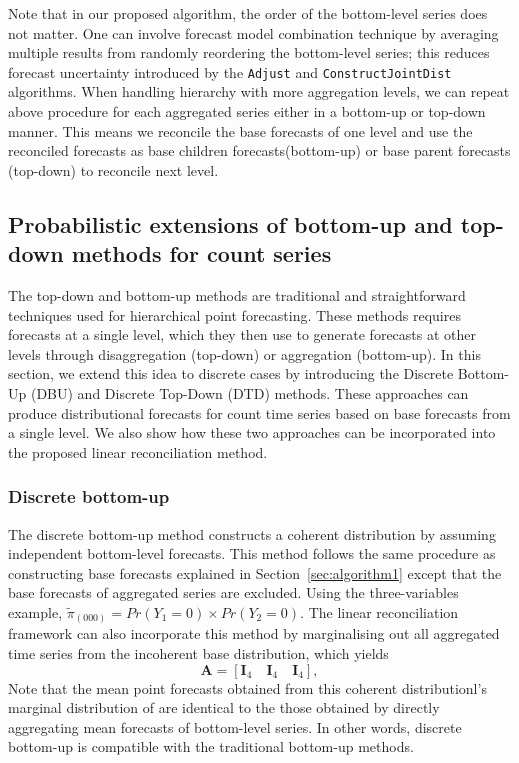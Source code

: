 \documentclass[a4paper,review,12pt,authoryear]{elsarticle}
\let\code=\texttt
\begin{document}
  Note that in our proposed algorithm, the order of the bottom-level series does not matter.
  One can involve forecast model combination technique by averaging multiple results from randomly reordering the bottom-level series; this reduces forecast uncertainty introduced by the \code{Adjust} and \code{ConstructJointDist} algorithms.
  When handling hierarchy with more aggregation levels, we can repeat above procedure for each aggregated series either in a bottom-up or top-down manner. This means we reconcile the base forecasts of one level and use the reconciled forecasts as base children forecasts(bottom-up) or base parent forecasts (top-down) to reconcile next level.

  

    \subsection{Probabilistic extensions of bottom-up and top-down methods for count series}

    The top-down and bottom-up methods are traditional and straightforward techniques used for hierarchical point forecasting. 
    These methods requires forecasts at a single level, which they then use to generate forecasts at other levels through disaggregation (top-down) or aggregation (bottom-up).
    In this section, we extend this idea to discrete cases by introducing the Discrete Bottom-Up (DBU) and Discrete Top-Down (DTD) methods. These approaches can produce distributional forecasts for count time series based on base forecasts from a single level.
    We also show how these two approaches can be incorporated into the proposed linear reconciliation method.

    \subsubsection*{\textbf{Discrete bottom-up}}
    \label{sec:bottomup}

    The discrete bottom-up method constructs a coherent distribution by assuming independent bottom-level forecasts.
    This method follows the same procedure as constructing base forecasts explained in Section~\ref{sec:algorithm1} except that the base forecasts of aggregated series are excluded.
    Using the three-variables example, $\tilde{\pi}_{(000)} = Pr(Y_1=0)\times Pr(Y_2=0)$. 
    The linear reconciliation framework can also incorporate this method by marginalising out all aggregated time series from the incoherent base distribution, which yields \[
    \mathbf{A} = [\mathbf{I}_4\quad \mathbf{I}_4 \quad \mathbf{I}_4 ],
    \]
    Note that the mean point forecasts obtained from this coherent distributionl's marginal distribution of  are identical to the those obtained by directly aggregating mean forecasts of bottom-level series.
    In other words, discrete bottom-up is compatible with the traditional bottom-up methods.
\end{document}

